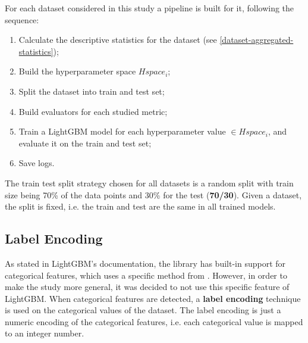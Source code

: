 For each dataset considered in this study a pipeline is built for it, following the sequence:

\begin{enumerate}
    \item Calculate the descriptive statistics for the dataset (see \ref{dataset-aggregated-statistics});
    \item Build the hyperparameter space $Hspace_i$;
    \item Split the dataset into train and test set;
    \item Build evaluators for each studied metric;
    \item Train a LightGBM model for each hyperparameter value $\in Hspace_i$, and evaluate it on the train and test set;
    \item Save logs.
\end{enumerate}

The train test split strategy chosen for all datasets is a random split with train size being 70\% of the data points and 30\% for the test (\textbf{70/30}). Given a dataset, the split is fixed, i.e. the train and test are the same in all trained models.

\subsection{Label Encoding}

As stated in LightGBM's documentation, the library has built-in support for categorical features, which uses a specific method from \cite{fisher1958grouping}. However, in order to make the study more general, it was decided to not use this specific feature of LightGBM. When categorical features are detected, a \textbf{label encoding} technique is used on the categorical values of the dataset. The label encoding is just a numeric encoding of the categorical features, i.e. each categorical value is mapped to an integer number. 
